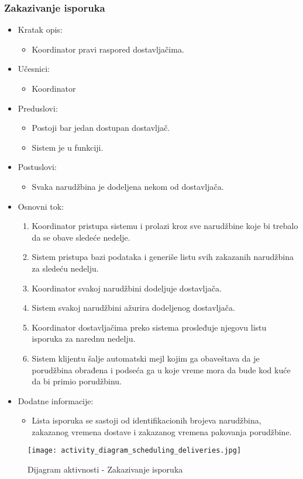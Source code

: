 
\subsubsection{Zakazivanje isporuka}

\begin{itemize}
	\item Kratak opis:
		\begin{itemize}
			\item Koordinator pravi raspored dostavljačima.
		\end{itemize}
	\item Učesnici:
		\begin{itemize}
		    \item Koordinator
		\end{itemize}
	\item Preduslovi:
		\begin{itemize}
		    \item Postoji bar jedan dostupan dostavljač.
		    \item Sistem je u funkciji.
		\end{itemize}
	\item Postuslovi:
		\begin{itemize}
			\item Svaka narudžbina je dodeljena nekom od dostavljača.
	\end{itemize}
	\item Osnovni tok:
		\begin{enumerate}
            \item Koordinator pristupa sistemu i prolazi kroz sve narudžbine koje bi trebalo da se obave sledeće nedelje.
            \item Sistem pristupa bazi podataka i generiše listu svih zakazanih narudžbina za sledeću nedelju.
           \item Koordinator svakoj narudžbini dodeljuje dostavljača.
           \item Sistem svakoj narudžbini ažurira dodeljenog dostavljača.
            \item Koordinator dostavljačima preko sistema prosleđuje njegovu listu isporuka za narednu nedelju.
            \item Sistem klijentu šalje automatski mejl kojim ga obaveštava da je porudžbina obrađena i podseća  ga u koje vreme mora da bude kod kuće da bi primio porudžbinu.
		\end{enumerate}
   \item Dodatne informacije:
        \begin{itemize}
            \item Lista isporuka se sastoji od identifikacionih brojeva narudžbina, zakazanog vremena dostave i zakazanog vremena pakovanja porudžbine. 
        \end{itemize}
\end{itemize}

\begin{figure}[H]
\begin{center}
\texttt{[image: activity\_diagram\_scheduling\_deliveries.jpg]}
\end{center}
    \caption{Dijagram aktivnosti - Zakazivanje isporuka}
\label{fig:Activity_diagram_scheduling_deliveries}
\end{figure}

